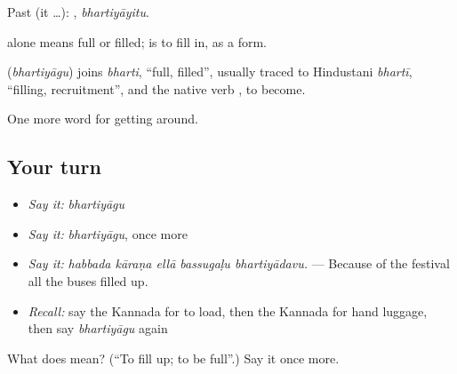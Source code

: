 Past (it …): , \emph{bhartiyāyitu}.

 alone means full or filled;   is to fill in, as a form.

\begin{cousinweb}
\textbf{} (\emph{bhartiyāgu}) joins \emph{bharti}, \textquotedblleft{}full, filled\textquotedblright{}, usually traced to Hindustani \emph{bhartī}, \textquotedblleft{}filling, recruitment\textquotedblright{}, and the native verb , to become.
\end{cousinweb}

\begin{grammarlens}[title={What you've built}]
One more word for getting around.
\end{grammarlens}

\subsection*{Your turn}
\begin{itemize}
\raggedright
  \item \emph{Say it:} \emph{bhartiyāgu}
  \item \emph{Say it:} \emph{bhartiyāgu}, once more
  \item \emph{Say it:} \emph{habbada kāraṇa ellā bassugaḷu bhartiyādavu.} — Because of the festival all the buses filled up.
  \item \emph{Recall:} say the Kannada for to load, then the Kannada for hand luggage, then say \emph{bhartiyāgu} again
\end{itemize}

\begin{tcolorbox}[breakable,colback=teal!4,colframe=teal!35!black,title={Before you move on}]
What does  mean? (\textquotedblleft{}To fill up; to be full\textquotedblright{}.) Say it once more.
\end{tcolorbox}
